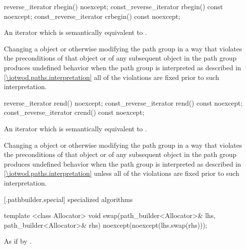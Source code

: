 %
%
\begin{itemdecl}
reverse_iterator rbegin() noexcept;
const_reverse_iterator rbegin() const noexcept;
const_reverse_iterator crbegin() const noexcept;
\end{itemdecl}
\begin{itemdescr}
\pnum
\returns
An iterator which is semantically equivalent to .

\pnum
\remarks
Changing a  object or otherwise modifying the path group in a way that violates the preconditions of that  object or of any subsequent  object in the path group produces undefined behavior when the path group is interpreted as described in \ref{\iotwod.paths.interpretation} all of the violations are fixed prior to such interpretation.
\end{itemdescr}

%
%
\begin{itemdecl}
reverse_iterator rend() noexcept;
const_reverse_iterator rend() const noexcept;
const_reverse_iterator crend() const noexcept;
\end{itemdecl}
\begin{itemdescr}
\pnum
\returns
An iterator which is semantically equivalent to .

\pnum
\remarks
Changing a  object or otherwise modifying the path group in a way that violates the preconditions of that  object or of any subsequent  object in the path group produces undefined behavior when the path group is interpreted as described in \ref{\iotwod.paths.interpretation} unless all of the violations are fixed prior to such interpretation.
\end{itemdescr}

[\iotwod.pathbuilder.special] { specialized algorithms}

%
\begin{itemdecl}
template <class Allocator>
void swap(path_builder<Allocator>& lhs, path_builder<Allocator>& rhs)
  noexcept(noexcept(lhs.swap(rhs)));
\end{itemdecl}
\begin{itemdescr}
\pnum
\effects
As if by .
\end{itemdescr}
